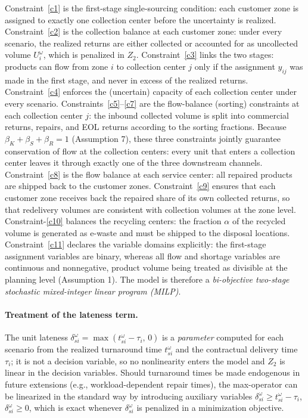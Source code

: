 \documentclass[11pt, a4paper]{article}
\begin{document}
Constraint~\ref{c1} is the first-stage single-sourcing condition: each customer zone is assigned to exactly one collection center before the uncertainty is realized. Constraint~\ref{c2} is the collection balance at each customer zone: under every scenario, the realized returns are either collected or accounted for as uncollected volume $U_i^{\omega}$, which is penalized in $Z_2$. Constraint~\ref{c3} links the two stages: products can flow from zone $i$ to collection center $j$ only if the assignment $y_{ij}$ was made in the first stage, and never in excess of the realized returns. Constraint~\ref{c4} enforces the (uncertain) capacity of each collection center under every scenario. Constraints~\ref{c5}--\ref{c7} are the flow-balance (sorting) constraints at each collection center $j$: the inbound collected volume is split into commercial returns, repairs, and EOL returns according to the sorting fractions. Because $\beta_{K}+\beta_{S}+\beta_{R}=1$ (Assumption 7), these three constraints jointly guarantee conservation of flow at the collection centers: every unit that enters a collection center leaves it through exactly one of the three downstream channels. Constraint~\ref{c8} is the flow balance at each service center: all repaired products are shipped back to the customer zones. Constraint~\ref{c9} ensures that each customer zone receives back the repaired share of its own collected returns, so that redelivery volumes are consistent with collection volumes at the zone level. Constraint-\ref{c10} balances the recycling centers: the fraction $\alpha$ of the recycled volume is generated as e-waste and must be shipped to the disposal locations. Constraint~\ref{c11} declares the variable domains explicitly: the first-stage assignment variables are binary, whereas all flow and shortage variables are continuous and nonnegative, product volume being treated as divisible at the planning level (Assumption 1). The model is therefore a \emph{bi-objective two-stage stochastic mixed-integer linear program (MILP)}.

\paragraph{Treatment of the lateness term.} The unit lateness $\delta_{si}^{\omega} = \max(t_{si}^{\omega}-\tau_i,\,0)$ is a \emph{parameter} computed for each scenario from the realized turnaround time $t_{si}^{\omega}$ and the contractual delivery time $\tau_i$; it is not a decision variable, so no nonlinearity enters the model and $Z_2$ is linear in the decision variables. Should turnaround times be made endogenous in future extensions (e.g., workload-dependent repair times), the max-operator can be linearized in the standard way by introducing auxiliary variables $\delta_{si}^{\omega} \geq t_{si}^{\omega} - \tau_i$, $\delta_{si}^{\omega} \geq 0$, which is exact whenever $\delta_{si}^{\omega}$ is penalized in a minimization objective.
\end{document}
